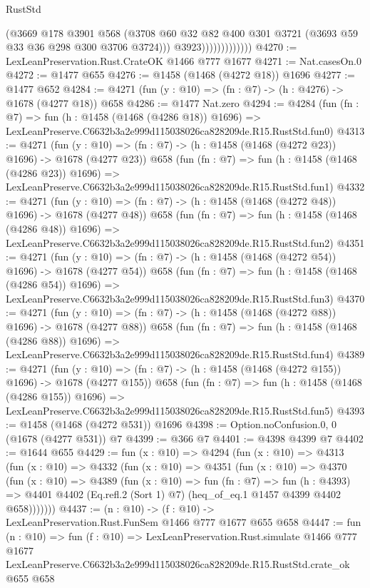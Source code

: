 \begin{lexlean}{RustStd}
\begin{coremodule}
                              (@3669
                                @178
                                @3901
                                @568
                                (@3708
                                  @60
                                  @32
                                  @82
                                  @400
                                  @301
                                  @3721
                                  (@3693 @59 @33 @36 @298 @300 @3706 @3724)))
                              @3923)))))))))))))
@4270 := LexLeanPreservation.Rust.CrateOK @1466 @777 @1677
@4271 := Nat.casesOn.{0}
@4272 := @1477 @655
@4276 := @1458 (@1468 (@4272 @18)) @1696
@4277 := @1477 @652
@4284 := @4271 (fun (y : @10) => (fn : @7) -> (h : @4276) -> @1678 (@4277 @18)) @658
@4286 := @1477 Nat.zero
@4294 := @4284
    (fun (fn : @7) =>
    fun (h : @1458 (@1468 (@4286 @18)) @1696) =>
    LexLeanPreserve.C6632b3a2e999d115038026ca828209de.R15.RustStd.fun0)
@4313 := @4271
    (fun (y : @10) => (fn : @7) -> (h : @1458 (@1468 (@4272 @23)) @1696) -> @1678 (@4277 @23))
    @658
    (fun (fn : @7) =>
    fun (h : @1458 (@1468 (@4286 @23)) @1696) =>
    LexLeanPreserve.C6632b3a2e999d115038026ca828209de.R15.RustStd.fun1)
@4332 := @4271
    (fun (y : @10) => (fn : @7) -> (h : @1458 (@1468 (@4272 @48)) @1696) -> @1678 (@4277 @48))
    @658
    (fun (fn : @7) =>
    fun (h : @1458 (@1468 (@4286 @48)) @1696) =>
    LexLeanPreserve.C6632b3a2e999d115038026ca828209de.R15.RustStd.fun2)
@4351 := @4271
    (fun (y : @10) => (fn : @7) -> (h : @1458 (@1468 (@4272 @54)) @1696) -> @1678 (@4277 @54))
    @658
    (fun (fn : @7) =>
    fun (h : @1458 (@1468 (@4286 @54)) @1696) =>
    LexLeanPreserve.C6632b3a2e999d115038026ca828209de.R15.RustStd.fun3)
@4370 := @4271
    (fun (y : @10) => (fn : @7) -> (h : @1458 (@1468 (@4272 @88)) @1696) -> @1678 (@4277 @88))
    @658
    (fun (fn : @7) =>
    fun (h : @1458 (@1468 (@4286 @88)) @1696) =>
    LexLeanPreserve.C6632b3a2e999d115038026ca828209de.R15.RustStd.fun4)
@4389 := @4271
    (fun (y : @10) => (fn : @7) -> (h : @1458 (@1468 (@4272 @155)) @1696) -> @1678 (@4277 @155))
    @658
    (fun (fn : @7) =>
    fun (h : @1458 (@1468 (@4286 @155)) @1696) =>
    LexLeanPreserve.C6632b3a2e999d115038026ca828209de.R15.RustStd.fun5)
@4393 := @1458 (@1468 (@4272 @531)) @1696
@4398 := Option.noConfusion.{0, 0} (@1678 (@4277 @531)) @7
@4399 := @366 @7
@4401 := @4398 @4399 @7
@4402 := @1644 @655
@4429 := fun (x : @10) =>
  @4294
    (fun (x : @10) =>
    @4313
      (fun (x : @10) =>
      @4332
        (fun (x : @10) =>
        @4351
          (fun (x : @10) =>
          @4370
            (fun (x : @10) =>
            @4389
              (fun (x : @10) =>
              fun (fn : @7) =>
              fun (h : @4393) =>
              @4401 @4402 (Eq.refl.{2} (Sort 1) @7) (heq_of_eq.{1} @1457 @4399 @4402 @658)))))))
@4437 := (n : @10) -> (f : @10) -> LexLeanPreservation.Rust.FunSem @1466 @777 @1677 @655 @658
@4447 := fun (n : @10) =>
  fun (f : @10) =>
  LexLeanPreservation.Rust.simulate
    @1466
    @777
    @1677
    LexLeanPreserve.C6632b3a2e999d115038026ca828209de.R15.RustStd.crate_ok
    @655
    @658
\end{coremodule}
\end{lexlean}
